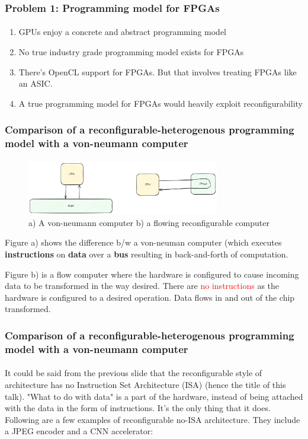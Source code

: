 \documentclass{beamer}
\begin{document}
\begin{frame}[fragile]
\frametitle{Problem 1: Programming model for FPGAs}
\framesubtitle{}
  \begin{enumerate}
    \item GPUs enjoy a concrete and abstract programming model
    \item No true industry grade programming model exists for FPGAs
    \item There's OpenCL support for FPGAs. But that involves treating
      FPGAs like an ASIC.
    \item A true programming model for FPGAs would heavily exploit
      reconfigurability
  \end{enumerate}
\end{frame}

\begin{frame}[fragile]
  \frametitle{Comparison of a reconfigurable-heterogenous programming model with a von-neumann
  computer}
  \framesubtitle{}
  \begin{figure}
    \centering
    \includegraphics[width=0.75\textwidth]{flow.png}
    \caption{a) A von-neumann computer b) a flowing reconfigurable computer}
    \label{}
  \end{figure}
  Figure a) shows the difference b/w a von-neuman computer (which executes
  \textbf{instructions} on \textbf{data} over a \textbf{bus} resulting in
  back-and-forth of computation. 

  Figure b) is a flow computer where the
  hardware is configured to cause incoming data to be transformed in the
  way desired. There are \textcolor{red}{no instructions} as the hardware
  is configured to a desired operation. Data flows in and out
  of the chip transformed. 
\end{frame}

\begin{frame}[fragile]
  \frametitle{Comparison of a reconfigurable-heterogenous programming model with a von-neumann
  computer}
  \framesubtitle{}
  It could be said from the previous slide that the reconfigurable style of
  architecture has no Instruction Set Architecture (ISA) (hence the title
  of this talk). "What to do with data" is a part of the hardware, instead
  of being attached with the data in the form of instructions. It's the
  only thing that it does.
  Following are a few examples of reconfigurable no-ISA architecture. They
  include a JPEG encoder and a CNN accelerator:
\end{frame}
\end{document}
